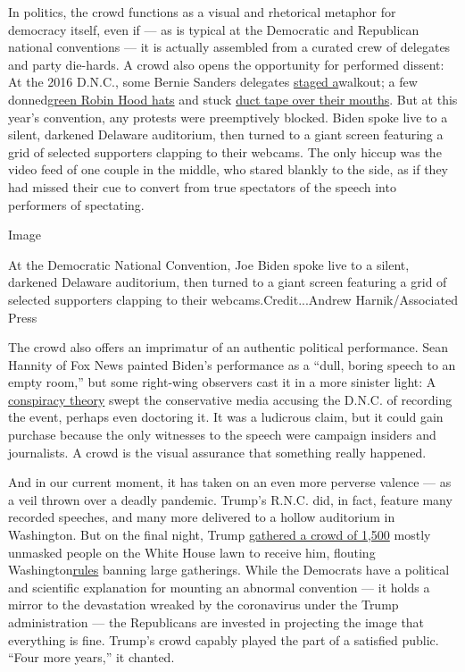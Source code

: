 In politics, the crowd functions as a visual and rhetorical metaphor for
democracy itself, even if --- as is typical at the Democratic and
Republican national conventions --- it is actually assembled from a
curated crew of delegates and party die-hards. A crowd also opens the
opportunity for performed dissent: At the 2016 D.N.C., some Bernie
Sanders delegates
\href{https://time.com/4425475/dnc-bernie-sanders-protest-walkout-convention/}{staged
a}walkout; a few
donned\href{https://theintercept.com/2016/07/25/on-day-one-of-the-democratic-convention-the-boos-have-it/}{green
Robin Hood hats} and stuck
\href{https://www.businessinsider.com/sanders-delegates-occupy-media-tents-dnc-2016-7}{duct
tape over their mouths}. But at this year's convention, any protests
were preemptively blocked. Biden spoke live to a silent, darkened
Delaware auditorium, then turned to a giant screen featuring a grid of
selected supporters clapping to their webcams. The only hiccup was the
video feed of one couple in the middle, who stared blankly to the side,
as if they had missed their cue to convert from true spectators of the
speech into performers of spectating.

Image

At the Democratic National Convention, Joe Biden spoke live to a silent,
darkened Delaware auditorium, then turned to a giant screen featuring a
grid of selected supporters clapping to their webcams.Credit...Andrew
Harnik/Associated Press

The crowd also offers an imprimatur of an authentic political
performance. Sean Hannity of Fox News painted Biden's performance as a
``dull, boring speech to an empty room,'' but some right-wing observers
cast it in a more sinister light: A
\href{https://twitter.com/johncardillo/status/1297267264715096065}{conspiracy
theory} swept the conservative media accusing the D.N.C. of recording
the event, perhaps even doctoring it. It was a ludicrous claim, but it
could gain purchase because the only witnesses to the speech were
campaign insiders and journalists. A crowd is the visual assurance that
something really happened.

And in our current moment, it has taken on an even more perverse valence
--- as a veil thrown over a deadly pandemic. Trump's R.N.C. did, in
fact, feature many recorded speeches, and many more delivered to a
hollow auditorium in Washington. But on the final night, Trump
\href{https://www.nytimes3xbfgragh.onion/2020/08/28/us/politics/trump-convention-speech-white-house.html}{gathered
a crowd of 1,500} mostly unmasked people on the White House lawn to
receive him, flouting
Washington\href{https://coronavirus.dc.gov/phasetwo}{rules} banning
large gatherings. While the Democrats have a political and scientific
explanation for mounting an abnormal convention --- it holds a mirror to
the devastation wreaked by the coronavirus under the Trump
administration --- the Republicans are invested in projecting the image
that everything is fine. Trump's crowd capably played the part of a
satisfied public. ``Four more years,'' it chanted.

